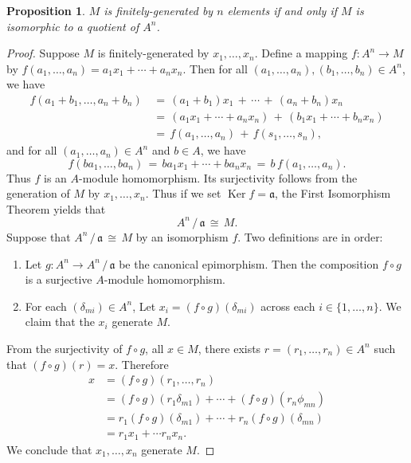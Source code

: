 \documentclass[11pt]{article}
\newtheorem{proposition}{Proposition}
\newcommand{\Ker}{\operatorname{Ker}}
\begin{document}
\begin{adjustwidth}{0.5cm}{}
	\begin{proposition}
		$M$ is finitely-generated by $n$ elements if and only if $M$ is isomorphic to a quotient of $A^{n}$.
	\end{proposition}
	\begin{proof}
    Suppose $M$ is finitely-generated by $x_{1}, \ldots, x_{n}$. Define a mapping $f : A^{n} \to M$ by $f(a_{1}, \ldots, a_{n}) = a_{1}x_{1} + \cdots + a_{n}x_{n}$. Then for all $(a_{1}, \ldots, a_{n}), (b_{1}, \ldots, b_{n}) \in A^{n}$, we have
		\begin{align*}
			f(a_{1} + b_{1}, \ldots, a_{n} + b_{n}) \, &= \, (a_{1} + b_{1}) x_{1} \, + \, \cdots \, + \, (a_{n} + b_{n})x_{n} \\
			&= \, (a_{1}x_{1} + \cdots + a_{n}x_{n}) \, + \, (b_{1}x_{1} + \cdots + b_{n}x_{n}) \\
			&= \, f(a_{1}, \ldots, a_{n}) \, + \, f(s_{1}, \ldots, s_{n}),
		\end{align*}
    and for all $(a_{1}, \ldots, a_{n}) \in A^{n}$ and $b \in A$, we have
		\[
			f(b a_{1}, \ldots, b a_{n}) \, = \, b a_{1} x_{1} + \cdots + b a_{n} x_{n} \, = \, b \, f(a_{1}, \ldots, a_{n}).
		\]
    Thus $f$ is an $A$-module homomorphism. Its surjectivity follows from the generation of $M$ by $x_{1}, \ldots, x_{n}$. Thus if we set $\Ker f = \mathfrak{a}$, the First Isomorphism Theorem yields that
		\[
			A^{n} \,/\, \mathfrak{a} \, \cong \, M.
		\]
		Suppose that $A^{n} \,/\, \mathfrak{a} \, \cong \, M$ by an isomorphism $f$. Two definitions are in order:
    \begin{enumerate}
      \item Let $g : A^{n} \to A^{n} \, / \, \mathfrak{a}$ be the canonical epimorphism. Then the composition $f \circ g$ is a surjective $A$-module homomorphism.
      \item For each $(\delta_{mi}) \in A^{n}$, Let $x_{i} = (f \circ g)(\delta_{mi})$ across each $i \in \{ 1, \ldots, n \}$. We claim that the $x_{i}$ generate $M$.
    \end{enumerate}
    From the surjectivity of $f \circ g$, all $x \in M$, there exists $r = (r_{1}, \ldots, r_{n}) \in A^{n}$ such that $(f \circ g)(r) = x$. Therefore 
		\begin{align*}
			x &= (f \circ g)(r_{1}, \ldots, r_{n}) \\
        &= (f \circ g)(r_{1} \delta_{m1}) + \cdots + (f \circ g)(r_{n} \phi_{mn}) \\
			  &= r_{1} (f \circ g)(\delta_{m1}) + \cdots + r_{n} (f \circ g)(\delta_{mn}) \\
			  &= r_{1} x_{1} + \cdots r_{n} x_{n}.
		\end{align*}
		We conclude that $x_{1}, \ldots, x_{n}$ generate $M$.
	\end{proof}
\end{adjustwidth}
\end{document}
